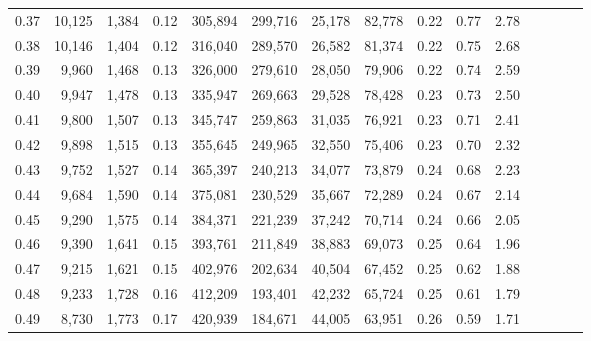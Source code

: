 \begin{tabular}{rrrcrrrrrrrrrrr}
0.37 &  10,125 &  1,384 &                                       0.12 &  305,894 &  299,716 &   25,178 &   82,778 &  0.22 &  0.77 &                         2.78 \\
0.38 &  10,146 &  1,404 &                                       0.12 &  316,040 &  289,570 &   26,582 &   81,374 &  0.22 &  0.75 &                         2.68 \\
0.39 &   9,960 &  1,468 &                                       0.13 &  326,000 &  279,610 &   28,050 &   79,906 &  0.22 &  0.74 &                         2.59 \\
0.40 &   9,947 &  1,478 &                                       0.13 &  335,947 &  269,663 &   29,528 &   78,428 &  0.23 &  0.73 &                         2.50 \\
0.41 &   9,800 &  1,507 &                                       0.13 &  345,747 &  259,863 &   31,035 &   76,921 &  0.23 &  0.71 &                         2.41 \\
0.42 &   9,898 &  1,515 &                                       0.13 &  355,645 &  249,965 &   32,550 &   75,406 &  0.23 &  0.70 &                         2.32 \\
0.43 &   9,752 &  1,527 &                                       0.14 &  365,397 &  240,213 &   34,077 &   73,879 &  0.24 &  0.68 &                         2.23 \\
0.44 &   9,684 &  1,590 &                                       0.14 &  375,081 &  230,529 &   35,667 &   72,289 &  0.24 &  0.67 &                         2.14 \\
0.45 &   9,290 &  1,575 &                                       0.14 &  384,371 &  221,239 &   37,242 &   70,714 &  0.24 &  0.66 &                         2.05 \\
0.46 &   9,390 &  1,641 &                                       0.15 &  393,761 &  211,849 &   38,883 &   69,073 &  0.25 &  0.64 &                         1.96 \\
0.47 &   9,215 &  1,621 &                                       0.15 &  402,976 &  202,634 &   40,504 &   67,452 &  0.25 &  0.62 &                         1.88 \\
0.48 &   9,233 &  1,728 &                                       0.16 &  412,209 &  193,401 &   42,232 &   65,724 &  0.25 &  0.61 &                         1.79 \\
0.49 &   8,730 &  1,773 &                                       0.17 &  420,939 &  184,671 &   44,005 &   63,951 &  0.26 &  0.59 &                         1.71 \\

\end{tabular}
